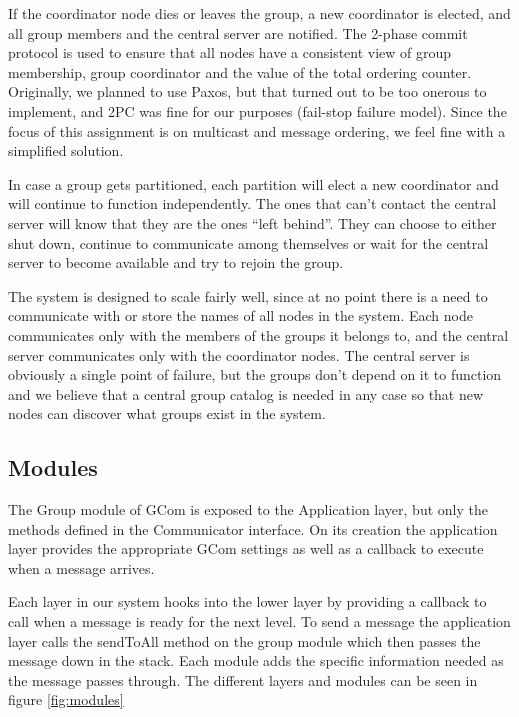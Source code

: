 \documentclass[10pt, oneside]{article}
\begin{document}
If the coordinator node dies or leaves the group, a new coordinator is elected,
and all group members and the central server are notified. The 2-phase commit
protocol is used to ensure that all nodes have a consistent view of group
membership, group coordinator and the value of the total ordering
counter. Originally, we planned to use Paxos, but that turned out to be too
onerous to implement, and 2PC was fine for our purposes (fail-stop failure
model). Since the focus of this assignment is on multicast and message ordering,
we feel fine with a simplified solution.

In case a group gets partitioned, each partition will elect a new coordinator
and will continue to function independently. The ones that can't contact the
central server will know that they are the ones ``left behind''. They can choose
to either shut down, continue to communicate among themselves or wait for the
central server to become available and try to rejoin the group.

The system is designed to scale fairly well, since at no point there is a need
to communicate with or store the names of all nodes in the system. Each node
communicates only with the members of the groups it belongs to, and the central
server communicates only with the coordinator nodes. The central server is
obviously a single point of failure, but the groups don't depend on it to
function and we believe that a central group catalog is needed in any case so
that new nodes can discover what groups exist in the system.
\pagebreak

\subsection{Modules}
The Group module of GCom is exposed to the Application layer, but only the
methods defined in the Communicator interface. On its creation the application
layer provides the appropriate GCom settings as well as a callback to execute
when a message arrives.

Each layer in our system hooks into the lower layer by providing a callback
to call when a message is ready for the next level. To send a message the
application layer calls the sendToAll method on the group module which then
passes the message down in the stack. Each module adds the specific information
needed as the message passes through. The different layers and modules can
be seen in figure \ref{fig:modules}
\end{document}
